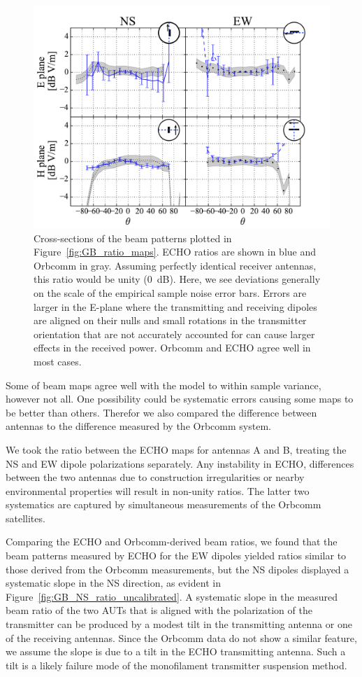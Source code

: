 \documentclass[preprint2,numberedappendix,tighten,twocolappendix]{aastex6}
\begin{document}
\begin{figure}
\begin{minipage}{0.45\textwidth}
\includegraphics[width=\columnwidth]{figures/GB_ratio_slice_5dB.pdf}
\caption{Cross-sections of the beam patterns plotted in Figure~\ref{fig:GB_ratio_maps}.  ECHO ratios are shown in blue and Orbcomm in gray.     Assuming perfectly identical receiver antennas, this ratio would be unity (0~dB). Here, we see deviations generally on the scale of the empirical sample noise error bars.  Errors are larger in the E-plane where the transmitting and receiving dipoles are aligned on their nulls and small rotations in the transmitter orientation that are not accurately accounted for can cause larger effects in the received power.  Orbcomm and ECHO agree well in most cases.
\label{fig:GB_ratio_slices}}
\end{minipage}\hfill
\end{figure}
Some of beam maps agree well with the model to within sample variance, however not all. One possibility could be systematic errors causing some maps to be better than others.  Therefor we also compared the difference between antennas to the difference measured by the Orbcomm system.

We took the ratio between the ECHO maps for antennas A and B, treating the NS and EW dipole polarizations separately.  Any instability in ECHO, differences between the two antennas due to construction irregularities or nearby environmental properties will result in non-unity ratios.  The latter two systematics are captured by   simultaneous measurements of the Orbcomm satellites.

Comparing the ECHO and Orbcomm-derived beam ratios, we found that the beam patterns measured by ECHO for the EW dipoles yielded ratios similar to those derived from the Orbcomm measurements, but the NS dipoles displayed a systematic slope in the NS direction, as evident in Figure~\ref{fig:GB_NS_ratio_uncalibrated}.  A systematic slope in the measured beam ratio of the two AUTs that is aligned with the polarization of the transmitter can be produced by a modest tilt in the transmitting antenna or one of the receiving antennas.  Since the Orbcomm data do not show a similar feature, we assume the slope is due to a tilt in the ECHO transmitting antenna.  Such a tilt is a likely failure mode of the monofilament transmitter suspension method.  
\end{document}
